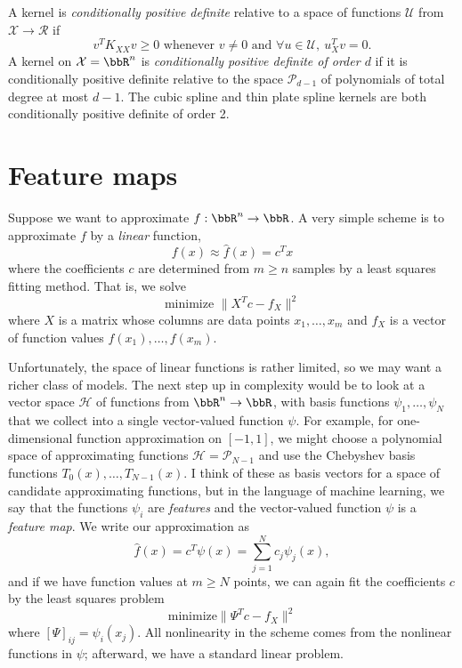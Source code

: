 \documentclass[12pt, leqno]{article} %
\begin{document}
A kernel is {\em conditionally positive definite} relative
to a space of functions $\mathcal{U}$ from $\mathcal{X} \rightarrow
\mathcal{R}$ if
\[
  v^T K_{XX} v \geq 0
  \mbox{ whenever } v \neq 0
  \mbox{ and } \forall u \in \mathcal{U}, ~ u_X^T v = 0.
\]
A kernel on $\mathcal{X} = \bbR^n$ is {\em conditionally positive
  definite of order $d$} if it is conditionally positive definite
relative to the space $\mathcal{P}_{d-1}$ of polynomials of total
degree at most $d-1$.  The cubic spline and thin plate spline kernels
are both conditionally positive definite of order 2.

\section{Feature maps}

Suppose we want to approximate $f : \bbR^n \rightarrow \bbR$.
A very simple scheme is to approximate $f$ by a {\em linear} function,
\[
  f(x) \approx \hat{f}(x) = c^T x
\]
where the coefficients $c$ are determined from $m \geq n$ samples by
a least squares fitting method.  That is, we solve
\[
  \mbox{minimize } \|X^T c-f_X\|^2
\]
where $X$ is a matrix whose columns are data points $x_1, \ldots, x_m$
and $f_X$ is a vector of function values $f(x_1), \ldots, f(x_m)$.

Unfortunately, the space of linear functions is rather limited, so we
may want a richer class of models.  The next step up in complexity
would be to look at a vector space $\mathcal{H}$ of functions from
$\bbR^n \rightarrow \bbR$, with basis functions
$\psi_1, \ldots, \psi_N$ that we collect into a single
vector-valued function $\psi$.
For example, for one-dimensional function approximation on $[-1,1]$,
we might choose a polynomial space of approximating functions
$\mathcal{H} = \mathcal{P}_{N-1}$ and use the Chebyshev basis functions
$T_0(x), \ldots, T_{N-1}(x)$.
I think of these as basis vectors for a space
of candidate approximating functions, but in the language of machine
learning, we say that the functions $\psi_i$ are {\em features} and
the vector-valued function $\psi$ is a {\em feature map}.  We
write our approximation as
\[
  \hat{f}(x) = c^T \psi(x) = \sum_{j=1}^N c_j \psi_j(x),
\]
and if we have function values at $m \geq N$ points, we can again fit
the coefficients $c$ by the least squares problem
\[
  \mbox{minimize} \|\Psi^T c - f_X\|^2
\]
where $[\Psi]_{ij} = \psi_i(x_j)$.  All nonlinearity in the
scheme comes from the nonlinear functions in $\psi$;
afterward, we have a standard linear problem.
\end{document}
